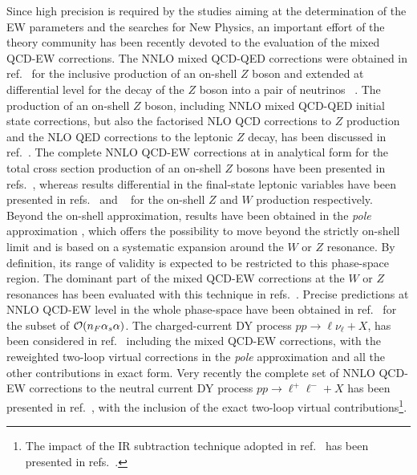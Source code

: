\documentclass[11pt,a4paper]{article}
\begin{document}
Since high precision is required by the studies aiming at the determination of the EW parameters and the searches for New Physics,
an important effort of the theory community has been recently devoted to the evaluation of the mixed QCD-EW corrections.
%
The NNLO mixed QCD-QED corrections were obtained in ref.~\cite{deFlorian:2018wcj}
for the inclusive production of an on-shell $Z$ boson and extended at differential level for the decay of the $Z$ boson into a pair of neutrinos ~\cite{Cieri:2020ikq}.
The production of an on-shell $Z$ boson,
including NNLO mixed QCD-QED initial state corrections, but also
the factorised NLO QCD corrections to $Z$ production and the NLO QED corrections to the leptonic $Z$ decay,
has been discussed in ref.~\cite{Delto:2019ewv}.
The complete NNLO QCD-EW corrections at \oaas
in analytical form for the total cross section production of an on-shell $Z$ bosons have been presented
in refs.~\cite{Bonciani:2016wya,Bonciani:2019nuy,Bonciani:2020tvf,Bonciani:2021iis},
whereas results differential in the final-state leptonic variables
have been presented in refs.~\cite{Buccioni:2020cfi} and ~\cite{Behring:2020cqi}
for the on-shell $Z$ and $W$ production respectively.
Beyond the on-shell approximation, results have been obtained in the {\it pole} approximation \cite{Denner:2019vbn},
which offers the possibility to move beyond the strictly on-shell limit
and is based on a systematic expansion around the $W$ or $Z$ resonance. By definition, its range of validity is expected to be restricted to this phase-space region.
The dominant part of the mixed QCD-EW corrections at the $W$ or $Z$ resonances has been evaluated with this technique in refs.~\cite{Dittmaier:2014qza,Dittmaier:2015rxo}.
Precise predictions at NNLO QCD-EW level in the whole phase-space have been obtained in ref.~\cite{Dittmaier:2020vra} for the subset of ${\cal O}(n_F\alpha_{s} \alpha)$.
The charged-current DY process $pp\to \ell \nu_\ell+X$, has been considered in ref.~\cite{Buonocore:2021rxx} including the mixed QCD-EW corrections,
with the reweighted two-loop virtual corrections in the {\it pole} approximation
and all the other contributions in exact form.
Very recently the complete set of NNLO QCD-EW corrections to the neutral current DY process $pp\to \ell^+\ell^-+X$
has been presented in ref.~\cite{Bonciani:2021zzf}, with the inclusion of the exact two-loop virtual
contributions\footnote{The impact of the IR subtraction technique adopted in ref.~\cite{Bonciani:2021zzf}
has been presented in refs.~\cite{Buonocore:2021tke, Camarda:2021jsw}.}.
\end{document}
